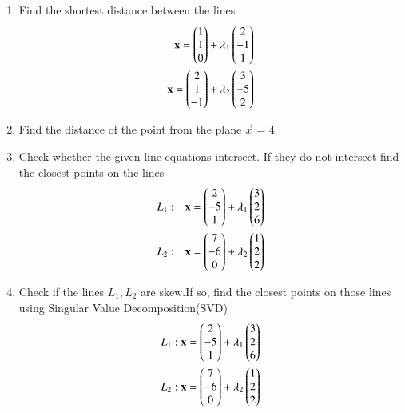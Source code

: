 \renewcommand{\theequation}{\theenumi}
\begin{enumerate}[label=\thesection.\arabic*.,ref=\thesection.\theenumi]

  
\item Find the shortest distance between the lines
\begin{align}
\mathbf{x}=\begin{pmatrix}1\\1\\0\end{pmatrix}+\lambda_1\begin{pmatrix}2\\-1\\1\end{pmatrix}\\
\mathbf{x}=\begin{pmatrix}2\\1\\-1\end{pmatrix}+\lambda_2\begin{pmatrix}3\\-5\\2\end{pmatrix}
\end{align}
\solution

\item Find the distance of the point  from the plane $\vec{x}$ = 4
\\
\solution

%
\item  Check whether the given line equations intersect. If they do not  intersect find the closest points on the lines 
\begin{align}
L_1 & : & \mathbf{x}=\begin{pmatrix}2\\-5\\1\end{pmatrix}+\lambda_1\begin{pmatrix}3\\2\\6\end{pmatrix}\\
L_2 & : & \mathbf{x}=\begin{pmatrix}7\\-6\\0\end{pmatrix}+\lambda_2\begin{pmatrix}1\\2\\2\end{pmatrix}\end{align}
\solution

\item Check if the lines $L_1,L_2$ are skew.If so, find the closest points on those lines using Singular Value Decomposition(SVD)
\begin{align}
L_1: \mathbf{x}=\begin{pmatrix}2\\-5\\1\end{pmatrix}+\lambda_1\begin{pmatrix}3\\2\\6\end{pmatrix}\\
L_2: \mathbf{x}=\begin{pmatrix}7\\-6\\0\end{pmatrix}+\lambda_2\begin{pmatrix}1\\2\\2\end{pmatrix}
\end{align}


\end{enumerate}
